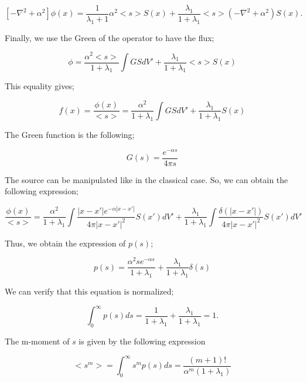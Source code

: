 \documentclass[a4paper, 12pt]{report}
\newcommand{\bl}{\big<}
\newcommand{\bg}{\big>}
\begin{document}
\begin{equation}
\left[- \nabla^2 + \alpha^2\right]\phi(x) = \frac{1}{\lambda_1 +1}\alpha^2 \bl s \bg S(x) + \frac{\lambda_1}{1+\lambda_1} \bl s \bg \left(-\nabla^2 + \alpha^2 \right) S(x).
\end{equation}

Finally, we use the Green of the operator to have the flux;

\begin{equation}
\phi = \frac{\alpha^2 \bl s \bg }{1+\lambda_1}\int GS dV' + \frac{\lambda_1}{1+\lambda_1} \bl s \bg S(x)
\end{equation}

This equality gives;

\begin{equation}
f(x) = \frac{\phi(x)}{\bl s \bg} = \frac{\alpha^2 }{1+\lambda_1}\int GS dV' + \frac{\lambda_1}{1+\lambda_1}S(x)
\end{equation}

The Green function is the following;

\begin{equation}
G(s) = \frac{e^{-\alpha s}}{4 \pi s}
\end{equation}

The source can be manipulated like in the classical case. So, we can obtain the following expression;

\begin{equation}
\frac{\phi(x)}{\bl s \bg} = \frac{\alpha^2}{1+\lambda_1} \int \frac{|x-x'|e^{-\alpha|x-x'|}}{4\pi |x-x'|^2}S(x')dV' + \frac{\lambda_1}{1+\lambda_1} \int \frac{\delta(|x-x'|)}{4\pi |x-x'|^2}S(x')dV' 
\end{equation}

Thus, we obtain the expression of $p(s)$;

\begin{equation}
p(s) = \frac{\alpha^2 se^{-\alpha s}}{1+\lambda_1} + \frac{\lambda_1}{1+\lambda_1}\delta(s)
\end{equation}

We can verify that this equation is normalized;

\begin{equation}
\int_0^\infty p(s) ds = \frac{1}{1+\lambda_1} + \frac{\lambda_1}{1+\lambda_1} = 1.
\end{equation}

The m-moment of $s$ is given by the following expression

\begin{equation}
\bl s^m \bg = \int_0^\infty s^m p(s) ds = \frac{(m+1)!}{\alpha^m (1+\lambda_1)}
\end{equation}
\end{document}
